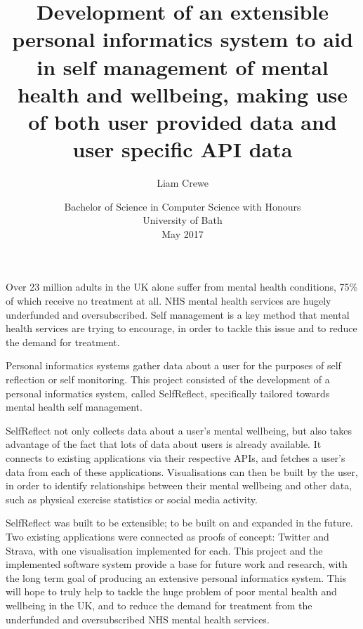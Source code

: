 \documentclass[11pt,openright,a4paper]{report}
\title{Development of an extensible personal informatics system to aid in self management of mental health and wellbeing, making use of both user provided data and user specific API data}
\author{Liam Crewe}
\date{Bachelor of Science in Computer Science with Honours\\University of Bath\\May 2017}
\begin{document}
\lstset{language=Java,breaklines,breakatwhitespace,basicstyle=\small}

\setcounter{page}{0}

\maketitle
\newpage


\newpage


\newpage


\abstract
Over 23 million adults in the UK alone suffer from mental health conditions, 75\% of which receive no treatment at all. NHS mental health services are hugely underfunded and oversubscribed. Self management is a key method that mental health services are trying to encourage, in order to tackle this issue and to reduce the demand for treatment.

Personal informatics systems gather data about a user for the purposes of self reflection or self monitoring. This project consisted of the development of a personal informatics system, called SelfReflect, specifically tailored towards mental health self management.

SelfReflect not only collects data about a user's mental wellbeing, but also takes advantage of the fact that lots of data about users is already available. It connects to existing applications via their respective APIs, and fetches a user's data from each of these applications. Visualisations can then be built by the user, in order to identify relationships between their mental wellbeing and other data, such as physical exercise statistics or social media activity.

SelfReflect was built to be extensible; to be built on and expanded in the future. Two existing applications were connected as proofs of concept: Twitter and Strava, with one visualisation implemented for each. This project and the implemented software system provide a base for future work and research, with the long term goal of producing an extensive personal informatics system. This will hope to truly help to tackle the huge problem of poor mental health and wellbeing in the UK, and to reduce the demand for treatment from the underfunded and oversubscribed NHS mental health services.
\newpage
\end{document}

